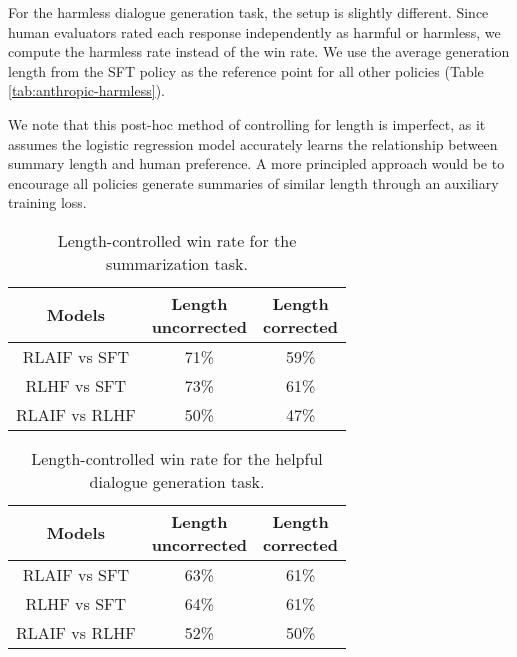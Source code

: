 \documentclass[11pt]{article}
\begin{document}
For the harmless dialogue generation task, the setup is slightly different. Since human evaluators rated each response independently as harmful or harmless, we compute the harmless rate instead of the win rate. We use the average generation length from the SFT policy as the reference point for all other policies (Table \ref{tab:anthropic-harmless}).

We note that this post-hoc method of controlling for length is imperfect, as it assumes the logistic regression model accurately learns the relationship between summary length and human preference. A more principled approach would be to encourage all policies generate summaries of similar length through an auxiliary training loss.

\begin{table}[ht]
\centering

\begin{tabular}{|c|c|c|}
\hline
Models         & \makecell{Length \\ uncorrected} & \makecell{Length \\ corrected} \\\hline
RLAIF vs SFT   & 71\%               & 59\%             \\\hline
RLHF vs SFT    & 73\%               & 61\%             \\\hline
RLAIF vs RLHF  & 50\%               & 47\%             \\\hline
\end{tabular}

\caption{Length-controlled win rate for the summarization task.}
\label{tab:tldr}
\end{table}

\begin{table}[ht]
\centering

\begin{tabular}{|c|c|c|}
\hline
Models         & \makecell{Length \\ uncorrected} & \makecell{Length \\ corrected} \\\hline
RLAIF vs SFT  & 63\%               & 61\%             \\\hline
RLHF vs SFT   & 64\%               & 61\%             \\\hline
RLAIF vs RLHF & 52\%               & 50\%             \\\hline
\end{tabular}

\caption{Length-controlled win rate for the helpful dialogue generation task.}
\label{tab:anthropic-helpful}
\end{table}
\end{document}
